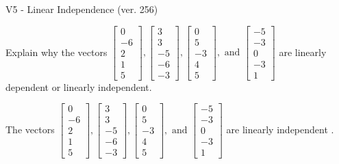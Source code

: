 \begin{exercise}
  \begin{exerciseTitle}V5 - Linear Independence (ver. 256)\end{exerciseTitle}
  \begin{exerciseStatement}
    Explain why the vectors \(\left[\begin{array}{r}
0 \\
-6 \\
2 \\
1 \\
5
\end{array}\right] , \left[\begin{array}{r}
3 \\
3 \\
-5 \\
-6 \\
-3
\end{array}\right] , \left[\begin{array}{r}
0 \\
5 \\
-3 \\
4 \\
5
\end{array}\right] , \text{ and } \left[\begin{array}{r}
-5 \\
-3 \\
0 \\
-3 \\
1
\end{array}\right]\) are linearly dependent or linearly independent.	


  \end{exerciseStatement}
  \begin{exerciseAnswer}
   The vectors \(\left[\begin{array}{r}
0 \\
-6 \\
2 \\
1 \\
5
\end{array}\right] , \left[\begin{array}{r}
3 \\
3 \\
-5 \\
-6 \\
-3
\end{array}\right] , \left[\begin{array}{r}
0 \\
5 \\
-3 \\
4 \\
5
\end{array}\right] , \text{ and } \left[\begin{array}{r}
-5 \\
-3 \\
0 \\
-3 \\
1
\end{array}\right]\) are 
  	 linearly independent  .
  


  \end{exerciseAnswer}
\end{exercise}